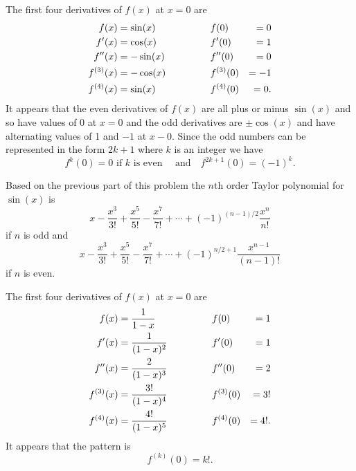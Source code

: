 \begin{activitySolution}
\item
    \btl
    \item The first four derivatives of $f(x)$ at $x=0$ are
    \begin{align*}
f(x) &= \sin(x) & \hspace{0.5in} & f(0) &= 0 \\
f'(x) &= \cos(x) & \hspace{0.5in} & f'(0) &= 1 \\
f''(x) &= -\sin(x) & \hspace{0.5in} & f''(0) &= 0 \\
f^{(3)}(x) &= -\cos(x) & \hspace{0.5in} & f^{(3)}(0) &= -1 \\
f^{(4)}(x) &= \sin(x) & \hspace{0.5in} & f^{(4)}(0) &= 0. \\
\end{align*}
It appears that the even derivatives of $f(x)$ are all plus or minus $\sin(x)$ and so have values of 0 at $x=0$ and the odd derivatives are $\pm \cos(x)$ and have alternating values of 1 and $-1$ at $x-0$. Since the odd numbers can be represented in the form $2k+1$ where $k$ is an integer we have
\[f^{k}(0) = 0 \text{ if } k \text{ is even } \ \ \ \text{ and } \ \ \ f^{2k+1}(0) = (-1)^k.\]

    \item Based on the previous part of this problem the $n$th order Taylor polynomial for $\sin(x)$ is
    \[x - \frac{x^3}{3!} + \frac{x^5}{5!} - \frac{x^7}{7!} + \cdots + (-1)^{(n-1)/2}\frac{x^n}{n!}\]
    if $n$ is odd and
    \[x - \frac{x^3}{3!} + \frac{x^5}{5!} - \frac{x^7}{7!} + \cdots + (-1)^{n/2+1}\frac{x^{n-1}}{(n-1)!}\]
    if $n$ is even.

    \etl

\item
    \btl
    \item The first four derivatives of $f(x)$ at $x=0$ are
    \begin{align*}
f(x) &= \frac{1}{1-x} & \hspace{0.5in} & f(0) &= 1 \\
f'(x) &= \frac{1}{(1-x)^2} & \hspace{0.5in} & f'(0) &= 1 \\
f''(x) &= \frac{2}{(1-x)^3} & \hspace{0.5in} & f''(0) &= 2 \\
f^{(3)}(x) &= \frac{3!}{(1-x)^4} & \hspace{0.5in} & f^{(3)}(0) &= 3! \\
f^{(4)}(x) &= \frac{4!}{(1-x)^5} & \hspace{0.5in} & f^{(4)}(0) &= 4!. \\
\end{align*}
It appears that the pattern is
\[f^{(k)}(0) = k!.\]


\end{activitySolution}

